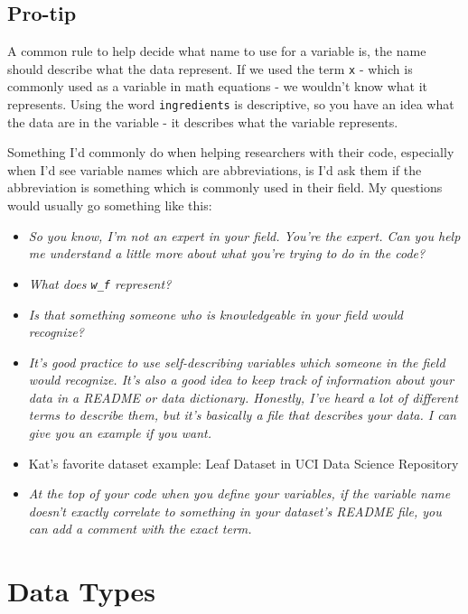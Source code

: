 \documentclass[
]{book}
\providecommand{\tightlist}{%
  \setlength{\itemsep}{0pt}\setlength{\parskip}{0pt}}
\begin{document}
\subsection{Pro-tip}\label{pro-tip}

A common rule to help decide what name to use for a variable is, the name should describe what the data represent. If we used the term \texttt{x} - which is commonly used as a variable in math equations - we wouldn't know what it represents. Using the word \texttt{ingredients} is descriptive, so you have an idea what the data are in the variable - it describes what the variable represents.

Something I'd commonly do when helping researchers with their code, especially when I'd see variable names which are abbreviations, is I'd ask them if the abbreviation is something which is commonly used in their field. My questions would usually go something like this:

\begin{itemize}
\tightlist
\item
  \emph{So you know, I'm not an expert in your field. You're the expert. Can you help me understand a little more about what you're trying to do in the code?}
\item
  \emph{What does \texttt{w\_f} represent?}
\item
  \emph{Is that something someone who is knowledgeable in your field would recognize?}
\item
  \emph{It's good practice to use self-describing variables which someone in the field would recognize. It's also a good idea to keep track of information about your data in a README or data dictionary. Honestly, I've heard a lot of different terms to describe them, but it's basically a file that describes your data. I can give you an example if you want.}
\item
  Kat's favorite dataset example: Leaf Dataset in UCI Data Science Repository \citep{leaf_288}
\item
  \emph{At the top of your code when you define your variables, if the variable name doesn't exactly correlate to something in your dataset's README file, you can add a comment with the exact term.}
\end{itemize}

\section{Data Types}\label{data-types-1}
\end{document}
